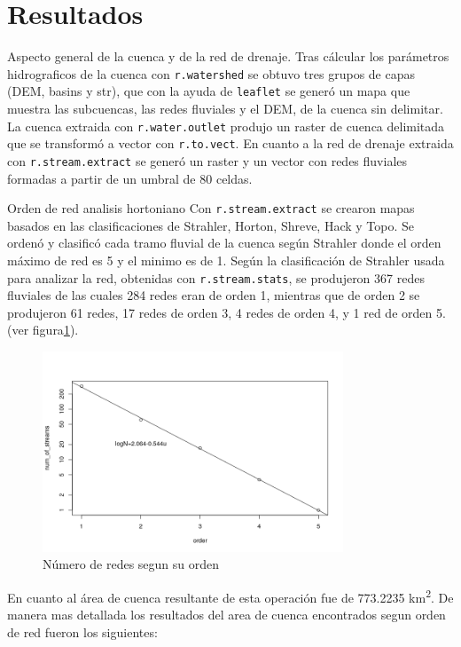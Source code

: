 \documentclass[11pt,]{article}
\begin{document}
\section{Resultados}\label{resultados}

Aspecto general de la cuenca y de la red de drenaje. Tras cálcular los
parámetros hidrograficos de la cuenca con \texttt{r.watershed} se obtuvo
tres grupos de capas (DEM, basins y str), que con la ayuda de
\texttt{leaflet} se generó un mapa que muestra las subcuencas, las redes
fluviales y el DEM, de la cuenca sin delimitar. La cuenca extraida con
\texttt{r.water.outlet} produjo un raster de cuenca delimitada que se
transformó a vector con \texttt{r.to.vect}. En cuanto a la red de
drenaje extraida con \texttt{r.stream.extract} se generó un raster y un
vector con redes fluviales formadas a partir de un umbral de 80 celdas.

Orden de red analisis hortoniano Con \texttt{r.stream.extract} se
crearon mapas basados en las clasificaciones de Strahler, Horton,
Shreve, Hack y Topo. Se ordenó y clasificó cada tramo fluvial de la
cuenca según Strahler donde el orden máximo de red es 5 y el minimo es
de 1. Según la clasificación de Strahler usada para analizar la red,
obtenidas con \texttt{r.stream.stats}, se produjeron 367 redes fluviales
de las cuales 284 redes eran de orden 1, mientras que de orden 2 se
produjeron 61 redes, 17 redes de orden 3, 4 redes de orden 4, y 1 red de
orden 5. (ver figura\ref {grafnro}).

\begin{figure}
\centering
\includegraphics[width=0.80000\textwidth]{Numero de red segun su orden.png}
\caption{Número de redes segun su orden\label{grafnro}}
\end{figure}

En cuanto al área de cuenca resultante de esta operación fue de 773.2235
km\textsuperscript{2}. De manera mas detallada los resultados del area
de cuenca encontrados segun orden de red fueron los siguientes:
\end{document}
